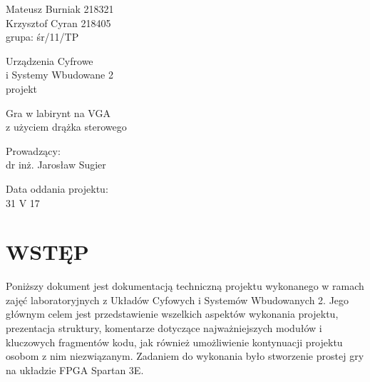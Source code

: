 \documentclass[11pt]{article}
\begin{document}
\thispagestyle{empty}

\noindent
Mateusz Burniak 218321 \\
Krzysztof Cyran 218405 \\
grupa: śr/11/TP

\vfill

\begin{center}
  \begin{Huge}
    Urządzenia Cyfrowe \\
    i Systemy Wbudowane 2 \\
    \vspace{.5cm}
    projekt
  \end{Huge}
  
  \vspace{3cm}
  
  \begin{Large}
    Gra w labirynt na VGA \\
    z użyciem drążka sterowego
  \end{Large}
  
  \vspace{3cm}
  
  \begin{Large}
    Prowadzący: \\
    dr inż. Jarosław Sugier
  \end{Large}
  
  \vspace{3cm}
  
  Data oddania projektu: \\
  31 V 17
  
\end{center}

\vfill

\newpage

\tableofcontents

\newpage


\section{WSTĘP}

\hspace*{0.55cm}Poniższy dokument jest dokumentacją techniczną projektu wykonanego w ramach zajęć laboratoryjnych z Układów Cyfowych i Systemów Wbudowanych 2. 
Jego głównym celem jest przedstawienie wszelkich aspektów wykonania projektu, prezentacja struktury, komentarze dotyczące najważniejszych modułów i kluczowych fragmentów kodu, jak również umożliwienie kontynuacji projektu osobom z nim niezwiązanym. 
Zadaniem do wykonania było stworzenie prostej gry na układzie FPGA Spartan 3E.
\end{document}
